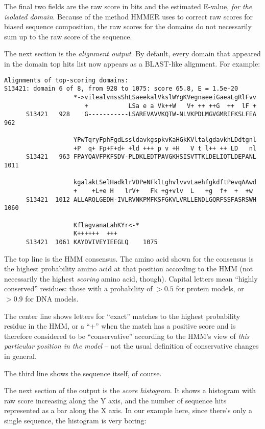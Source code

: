 The final two fields are the raw score in bits and the estimated
E-value, {\em for the isolated domain}. Because of the method HMMER
uses to correct raw scores for biased sequence composition, the raw
scores for the domains do not necessarily sum up to the raw score of
the sequence.

The next section is the {\em alignment output}. By default, every
domain that appeared in the domain top hits list now appears as a
BLAST-like alignment. For example:

{\small\begin{verbatim}
Alignments of top-scoring domains:
S13421: domain 6 of 8, from 928 to 1075: score 65.8, E = 1.5e-20
                   *->vilealvnssShLSaeekalVkslWYgKVegnaeeiGaeaLgRlFvv
                      +           LSa e a Vk++W   V+ ++ ++G  ++  lF +
      S13421   928    G-----------LSAREVAVVKQTW-NLVKPDLMGVGMRIFKSLFEA 962  

                   YPwTqryFphFgdLssldavkgspkvKaHGkKVltalgdavkhLDdtgnl
                   +P  q+ Fp+F+d+ +ld +++ p v +H   V t l++ ++ LD   nl
      S13421   963 FPAYQAVFPKFSDV-PLDKLEDTPAVGKHSISVTTKLDELIQTLDEPANL 1011 

                   kgalakLSelHadklrVDPeNFklLghvlvvvLaehfgkdftPevqAAwd
                   +    +L+e H   lrV+   Fk +g+vlv  L   +g  f+  +  +w 
      S13421  1012 ALLARQLGEDH-IVLRVNKPMFKSFGKVLVRLLENDLGQRFSSFASRSWH 1060 

                   KflagvanaLahKYr<-*
                   K++++++  +++      
      S13421  1061 KAYDVIVEYIEEGLQ    1075 
\end{verbatim}}

The top line is the HMM consensus. The amino acid shown for the
consensus is the highest probability amino acid at that position
according to the HMM (not necessarily the highest {\em scoring} amino
acid, though). Capital letters mean ``highly conserved'' residues:
those with a probability of $> 0.5$ for protein models, or $> 0.9$ for
DNA models. 

The center line shows letters for ``exact'' matches to the highest
probability residue in the HMM, or a ``+'' when the match has a
positive score and is therefore considered to be ``conservative''
according to the HMM's view of {\em this particular position in the
model} -- not the usual definition of conservative changes in general.

The third line shows the sequence itself, of course.

The next section of the output is the {\em score histogram}.  It shows
a histogram with raw score increasing along the Y axis, and the number
of sequence hits represented as a bar along the X axis. In our example
here, since there's only a single sequence, the histogram is very
boring:


